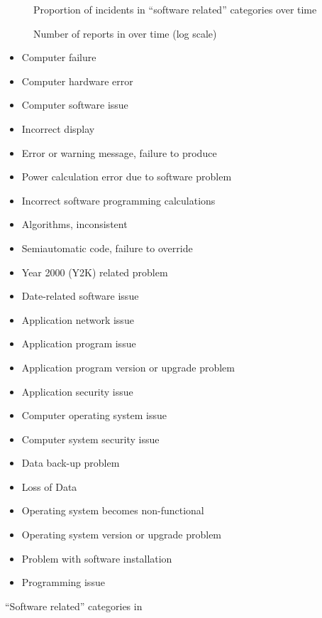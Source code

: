 \documentclass{cshonours}
\begin{document}
\begin{figure}
  \centering
  
  \caption{Proportion of incidents in ``software related'' categories over time}
  \label{fig:proportiongraph}
\end{figure}

\begin{figure}
  \centering
  
  \caption{Number of reports in \maude over time (log scale)}
 \label{fig:totalgraph}
\end{figure}

\begin{table}
\begin{multicols}{2}
{\smaller
\begin{itemize}
  \item Computer failure
  \item Computer hardware error
  \item Computer software issue
  \item Incorrect display
  \item Error or warning message, failure to produce
  \item Power calculation error due to software problem
  \item Incorrect software programming calculations
  \item Algorithms, inconsistent
  \item Semiautomatic code, failure to override
  \item Year 2000 (Y2K) related problem
  \item Date-related software issue
  \item Application network issue
  \item Application program issue
  \item Application program version or upgrade problem
  \item Application security issue
  \item Computer operating system issue
  \item Computer system security issue
  \item Data back-up problem
  \item Loss of Data
  \item Operating system becomes non-functional
  \item Operating system version or upgrade problem
  \item Problem with software installation
  \item Programming issue
\end{itemize}
}
\end{multicols}
  \caption{``Software related'' categories in \maude}
  \label{tab:fdacategories}
\end{table}
\end{document}
